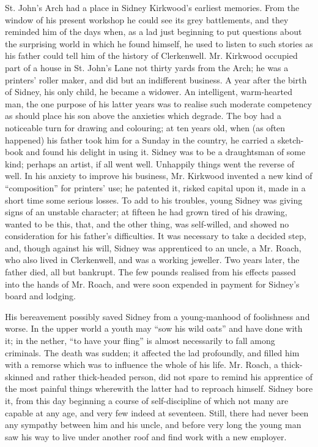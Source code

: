 St. John's Arch had a place in Sidney Kirkwood's earliest memories. From
the window of his present workshop he could see its grey battlements,
and they reminded him of the days when, as a lad just beginning to put
questions about the surprising world in which he found himself, he used
to listen to such stories as his father could tell him of the history of
Clerkenwell. Mr. Kirkwood occupied part of a house in St. John's Lane
{}not thirty yards from the Arch; he was a printers' roller maker, and
did but an indifferent business. A year after the birth of Sidney, his
only child, he became a widower. An intelligent, warm-hearted man, the
one purpose of his latter years was to realise such moderate competency
as should place his son above the anxieties which degrade. The boy had a
noticeable turn for drawing and colouring; at ten years old, when (as
often happened) his father took him for a Sunday in the country, he
carried a sketch-book and found his delight in using it. Sidney was to
be a draughtsman of some kind; perhaps an artist, if all went well.
Unhappily things went the reverse of well. In his anxiety to improve his
business, Mr. Kirkwood invented a new kind of ``composition'' for
printers' use; he patented it, risked capital upon it, made in a short
time some serious losses. To add to his troubles, young Sidney was
giving signs of an unstable character; at fifteen he had grown tired of
his drawing, wanted to be this, that, and the other thing, {}was
self-willed, and showed no consideration for his father's difficulties.
It was necessary to take a decided step, and, though against his will,
Sidney was apprenticed to an uncle, a Mr. Roach, who also lived in
Clerkenwell, and was a working jeweller. Two years later, the father
died, all but bankrupt. The few pounds realised from his effects passed
into the hands of Mr. Roach, and were soon expended in payment for
Sidney's board and lodging.

His bereavement possibly saved Sidney from a young-manhood of
foolishness and worse. In the upper world a youth may ``sow his wild
oats'' and have done with it; in the nether, ``to have your fling'' is
almost necessarily to fall among criminals. The death was sudden; it
affected the lad profoundly, and filled him with a remorse which was to
influence the whole of his life. Mr. Roach, a thick-skinned and rather
thick-headed person, did not spare to remind his apprentice of the most
painful things wherewith the latter had to reproach himself. Sidney bore
it, {}from this day beginning a course of self-discipline of which not
many are capable at any age, and very few indeed at seventeen. Still,
there had never been any sympathy between him and his uncle, and before
very long the young man saw his way to live under another roof and find
work with a new employer.

